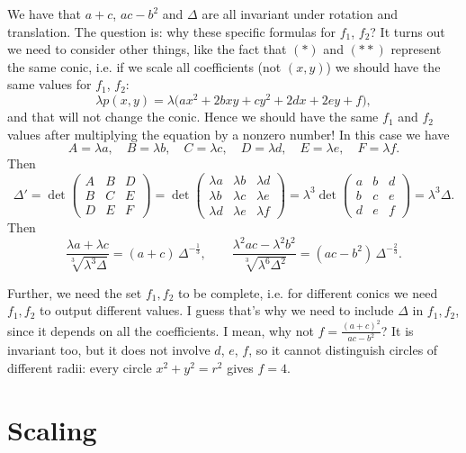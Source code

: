 We have that $a+c$, $ac-b^2$ and $\Delta$ are all invariant under rotation and translation. The question is: why these specific formulas for $f_1$, $f_2$? It turns out we need to consider other things, like the fact that $(*)$ and $(**)$ represent the same conic, i.e. if we scale all coefficients (not $(x,y)$) we should have the same values for $f_1$, $f_2$:
\[
\lambda p(x,y) = \lambda\big(ax^2 + 2bxy + cy^2 + 2dx + 2ey + f\big),
\]
and that will not change the conic. Hence we should have the same $f_1$ and $f_2$ values after multiplying the equation by a nonzero number! In this case we have
\[
A = \lambda a, \quad B = \lambda b, \quad C = \lambda c, \quad D = \lambda d, \quad E = \lambda e, \quad F = \lambda f .
\]
Then
\[
\Delta' = \det \begin{pmatrix} A & B & D \\ B & C & E \\ D & E & F \end{pmatrix}
= \det \begin{pmatrix} \lambda a & \lambda b & \lambda d \\ \lambda b & \lambda c & \lambda e \\ \lambda d & \lambda e & \lambda f \end{pmatrix}
= \lambda^3 \det \begin{pmatrix} a & b & d \\ b & c & e \\ d & e & f \end{pmatrix} = \lambda^3 \Delta .
\]
Then
\[
\frac{\lambda a + \lambda c}{\sqrt[3]{\lambda^3 \Delta}} = (a+c)\,\Delta^{-\frac13},
\qquad
\frac{\lambda^2 ac - \lambda^2 b^2}{\sqrt[3]{\lambda^6 \Delta^2}} = (ac-b^2)\,\Delta^{-\frac23}.
\]

Further, we need the set $f_1, f_2$ to be complete, i.e. for different conics we need $f_1, f_2$ to output different values. I guess that's why we need to include $\Delta$ in $f_1, f_2$, since it depends on all the coefficients. I mean, why not $f = \frac{(a+c)^2}{ac-b^2}$? It is invariant too, but it does not involve $d$, $e$, $f$, so it cannot distinguish circles of different radii: every circle $x^2 + y^2 = r^2$ gives $f = 4$.

\section{Scaling}


